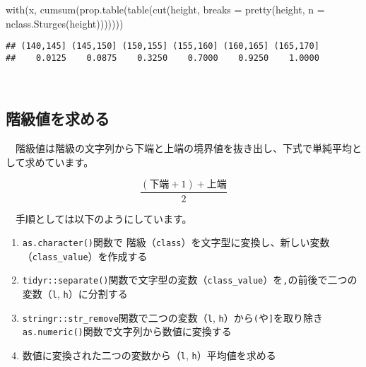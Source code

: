 \documentclass[
  12pt,
]{book}
\newenvironment{Shaded}{\begin{snugshade}}{\end{snugshade}}
\newcommand{\AttributeTok}[1]{\textcolor[rgb]{0.77,0.63,0.00}{#1}}
\newcommand{\FunctionTok}[1]{\textcolor[rgb]{0.00,0.00,0.00}{#1}}
\newcommand{\NormalTok}[1]{#1}
\providecommand{\tightlist}{%
  \setlength{\itemsep}{0pt}\setlength{\parskip}{0pt}}
\begin{document}
\begin{Shaded}
\begin{Highlighting}[]
\FunctionTok{with}\NormalTok{(x, }\FunctionTok{cumsum}\NormalTok{(}\FunctionTok{prop.table}\NormalTok{(}\FunctionTok{table}\NormalTok{(}\FunctionTok{cut}\NormalTok{(height, }\AttributeTok{breaks =} \FunctionTok{pretty}\NormalTok{(height, }\AttributeTok{n =} \FunctionTok{nclass.Sturges}\NormalTok{(height)))))))}
\end{Highlighting}
\end{Shaded}

\begin{verbatim}
## (140,145] (145,150] (150,155] (155,160] (160,165] (165,170] 
##    0.0125    0.0875    0.3250    0.7000    0.9250    1.0000
\end{verbatim}

　

\hypertarget{ux968eux7d1aux5024ux3092ux6c42ux3081ux308b}{%
\subsection{階級値を求める}\label{ux968eux7d1aux5024ux3092ux6c42ux3081ux308b}}

　階級値は階級の文字列から下端と上端の境界値を抜き出し、下式で単純平均として求めています。

\[\frac{(\mbox{下端} + 1) + \mbox{上端}}{2}\]

　手順としては以下のようにしています。

\begin{enumerate}
\def\labelenumi{\arabic{enumi}.}
\tightlist
\item
  \texttt{as.character()}関数で 階級（\texttt{class}）を文字型に変換し、新しい変数（\texttt{class\_value}）を作成する\\
\item
  \texttt{tidyr::separate()}関数で文字型の変数（\texttt{class\_value}）を\texttt{,}の前後で二つの変数（\texttt{l}, \texttt{h}）に分割する\\
\item
  \texttt{stringr::str\_remove}関数で二つの変数（\texttt{l}, \texttt{h}）から\texttt{(}や\texttt{{]}}を取り除き\texttt{as.numeric()}関数で文字列から数値に変換する\\
\item
  数値に変換された二つの変数から（\texttt{l}, \texttt{h}）平均値を求める
\end{enumerate}
\end{document}
